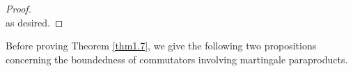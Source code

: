 \documentclass[oneside,english,a4wide]{amsart}
\numberwithin{equation}{section}
\numberwithin{figure}{section}
\theoremstyle{plain}
\theoremstyle{plain}
\theoremstyle{definition}
\theoremstyle{plain}
\theoremstyle{remark}
\theoremstyle{definition}
\theoremstyle{remark}
\theoremstyle{definition}
\newcommand{\8}{\infty}
\begin{document}
\begin{proof}
\begin{equation*}
	\end{equation*}
	as desired.
\end{proof}


Before proving Theorem \ref{thm1.7}, we give the following two propositions concerning the boundedness of commutators involving martingale paraproducts.
\end{document}
